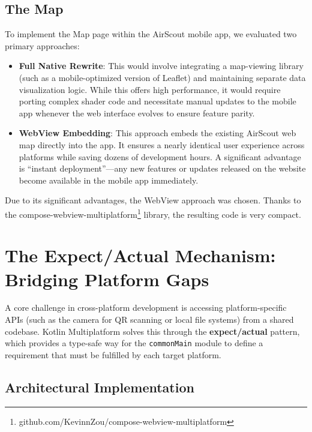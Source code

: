 \subsection{The Map}

To implement the Map page within the AirScout mobile app, we evaluated two
primary approaches:

\begin{itemize}
    \item \textbf{Full Native Rewrite}: This would involve integrating a map-viewing library (such as a mobile-optimized version of Leaflet) and maintaining separate data visualization logic. While this offers high performance, it would require porting complex shader code and necessitate manual updates to the mobile app whenever the web interface evolves to ensure feature parity.

    \item \textbf{WebView Embedding}: This approach embeds the existing AirScout web map directly into the app. It ensures a nearly identical user experience across platforms while saving dozens of development hours. A significant advantage is ``instant deployment''---any new features or updates released on the website become available in the mobile app immediately.
\end{itemize}

Due to its significant advantages, the WebView approach was chosen. Thanks to
the
compose-webview-multiplatform\footnote{github.com/KevinnZou/compose-webview-multiplatform}
library, the resulting code is very compact.


\section{The Expect/Actual Mechanism: Bridging Platform Gaps}

A core challenge in cross-platform development is accessing platform-specific
APIs (such as the camera for QR scanning or local file systems) from a shared
codebase. Kotlin Multiplatform solves this through the \textbf{expect/actual}
pattern, which provides a type-safe way for the \texttt{commonMain} module to
define a requirement that must be fulfilled by each target platform.

\subsection{Architectural Implementation}

